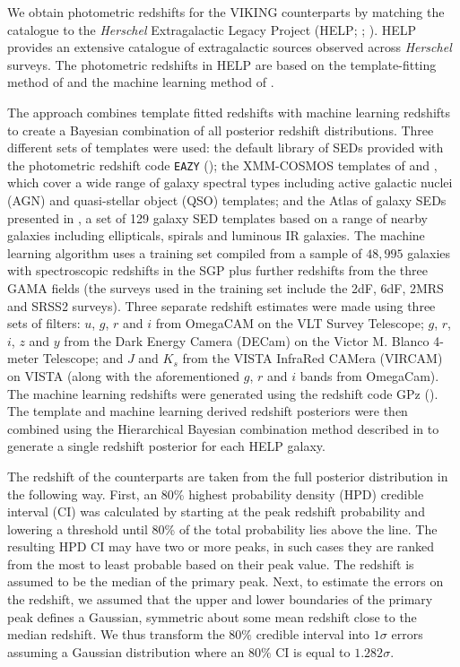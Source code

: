 We obtain photometric redshifts for the VIKING counterparts by matching the catalogue to the \textit{Herschel} Extragalactic Legacy Project (HELP; \citealt{Vaccari_2016}; \citealt{Shirley_2019}). HELP provides an extensive catalogue of extragalactic sources observed across \textit{Herschel} surveys. The photometric redshifts in HELP are based on the template-fitting method of \citealt{Duncan_2018a} and the machine learning method of \citealt{Duncan_2018b}.

The approach combines template fitted redshifts with machine learning redshifts to create a Bayesian combination of all posterior redshift distributions. Three different sets of templates were used: the default library of SEDs provided with the photometric redshift code \texttt{EAZY} (\citealt{Brammer_2008}); the XMM-COSMOS templates of \citealt{Salvato_2009} and \citealt{Salvato_2011}, which cover a wide range of galaxy spectral types including active galactic nuclei (AGN) and quasi-stellar object (QSO) templates; and the Atlas of galaxy SEDs presented in \citealt{Brown_2014}, a set of 129 galaxy SED templates based on a range of nearby galaxies including ellipticals, spirals and luminous IR galaxies. The machine learning algorithm uses a training set compiled from a sample of $48,995$ galaxies with spectroscopic redshifts in the SGP plus further redshifts from the three GAMA fields (the surveys used in the training set include the 2dF, 6dF, 2MRS and SRSS2 surveys). Three separate redshift estimates were made using three sets of filters: $u$, $g$, $r$ and $i$ from OmegaCAM on the VLT Survey Telescope; $g$, $r$, $i$, $z$ and $y$ from the Dark Energy Camera (DECam) on the Victor M. Blanco 4-meter Telescope; and $J$ and $K_s$ from the VISTA InfraRed CAMera (VIRCAM) on VISTA (along with the aforementioned $g$, $r$ and $i$ bands from OmegaCam). The machine learning redshifts were generated using the redshift code GPz (\citealt{Almosallam_2016}). The template and machine learning derived redshift posteriors were then combined using the Hierarchical Bayesian combination method described in \citealt{Dahlen_2013} to generate a single redshift posterior for each HELP galaxy.

The redshift of the counterparts are taken from the full posterior distribution in the following way. First, an 80\% highest probability density (HPD) credible interval (CI) was calculated by starting at the peak redshift probability and lowering a threshold until 80\% of the total probability lies above the line. The resulting HPD CI may have two or more peaks, in such cases they are ranked from the most to least probable based on their peak value. The redshift is assumed to be the median of the primary peak. Next, to estimate the errors on the redshift, we assumed that the upper and lower boundaries of the primary peak defines a Gaussian, symmetric about some mean redshift close to the median redshift. We thus transform the $80\%$ credible interval into $1\sigma$ errors assuming a Gaussian distribution where an $80\%$ CI is equal to $1.282\sigma$.

